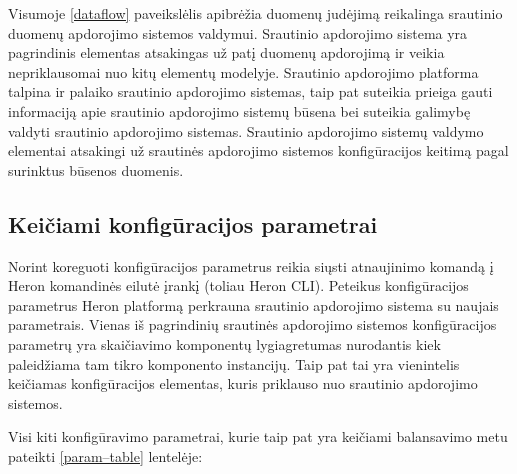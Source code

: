 \documentclass{VUMIFPSbakalaurinis}
\begin{document}
Visumoje \ref{dataflow} paveikslėlis apibrėžia duomenų judėjimą reikalinga srautinio duomenų apdorojimo sistemos valdymui. Srautinio apdorojimo sistema yra pagrindinis elementas atsakingas už patį duomenų apdorojimą ir veikia nepriklausomai nuo kitų elementų modelyje. Srautinio apdorojimo platforma talpina ir palaiko srautinio apdorojimo sistemas, taip pat suteikia prieiga gauti informaciją apie srautinio apdorojimo sistemų būsena bei suteikia galimybę valdyti srautinio apdorojimo sistemas. Srautinio apdorojimo sistemų valdymo elementai atsakingi už srautinės apdorojimo sistemos konfigūracijos keitimą pagal surinktus būsenos duomenis.

\subsection{Keičiami konfigūracijos parametrai}

Norint koreguoti konfigūracijos parametrus reikia siųsti atnaujinimo komandą į Heron komandinės eilutė įrankį (toliau Heron CLI). Peteikus konfigūracijos parametrus Heron platformą perkrauna srautinio apdorojimo sistema su naujais parametrais. 
Vienas iš pagrindinių srautinės apdorojimo sistemos konfigūracijos parametrų yra skaičiavimo komponentų lygiagretumas nurodantis kiek paleidžiama tam tikro komponento instancijų. Taip pat tai yra vienintelis keičiamas konfigūracijos elementas, kuris priklauso nuo srautinio apdorojimo sistemos.

Visi kiti konfigūravimo parametrai\cite{configDocument}, kurie taip pat yra keičiami balansavimo metu pateikti \ref{param–table} lentelėje:
\end{document}
